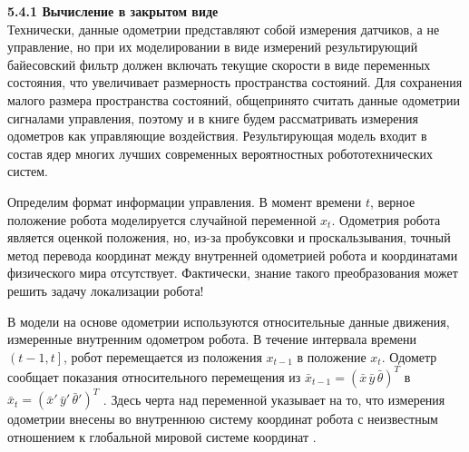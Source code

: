 \documentclass[10pt,a4paper]{article}
\begin{document}
\textbf{5.4.1 Вычисление в закрытом виде}\\

Технически, данные одометрии представляют собой измерения датчиков, а не управление, но при их моделировании в виде измерений результирующий байесовский фильтр должен включать текущие скорости в виде переменных состояния, что увеличивает размерность пространства состояний. Для сохранения малого размера пространства состояний, общепринято считать данные одометрии сигналами управления, поэтому и в книге будем рассматривать измерения одометров как управляющие воздействия. Результирующая модель входит в состав ядер многих лучших современных вероятностных робототехнических систем. 

Определим формат информации управления. В момент времени $t$, верное положение робота моделируется случайной переменной $x_t$. Одометрия робота является оценкой положения, но, из-за пробуксовки и проскальзывания, точный метод перевода координат между внутренней одометрией робота и координатами физического мира отсутствует. Фактически, знание такого преобразования может решить задачу локализации робота! 

В модели на основе одометрии используются относительные данные движения, измеренные внутренним одометром робота. В течение интервала времени $\left( t - 1, t\right] $,
робот перемещается из положения $x_{t-1}$ в положение $x_t$. Одометр сообщает показания относительного перемещения из $\bar{x}_{t-1}=(\bar{x}\,\bar{y}\,\bar{\theta})^T$ в $\bar{x}_t=(\bar{x}'\,\bar{y}'\,\bar{\theta}')^T$ . Здесь черта над переменной указывает на то, что измерения одометрии внесены во внутреннюю систему координат робота с неизвестным отношением к глобальной мировой системе координат .\\
\end{document}
